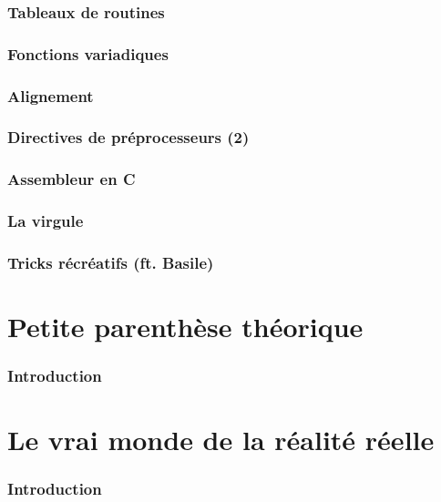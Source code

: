 \documentclass{minitelreport}
\begin{document}
\begin{refsection}
		\section{Tableaux de routines}
		
		\section{Fonctions variadiques}
		
		\section{Alignement}
		
		\section{Directives de préprocesseurs (2)}
		
		\section{Assembleur en C}
		
		\section{La virgule}
		
		\section{Tricks récréatifs (ft. Basile)}
		
\part{Petite parenthèse théorique}
	\section*{Introduction}
	
\part{Le vrai monde de la réalité réelle}
	\section*{Introduction}
	

\end{refsection}
\end{document}
